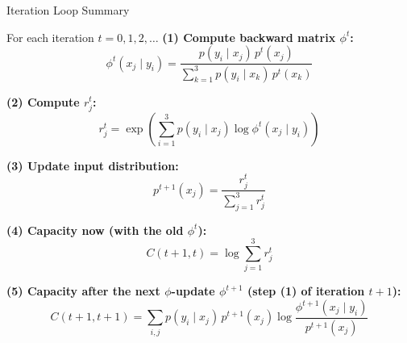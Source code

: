 \documentclass{beamer}
\begin{document}
\begin{frame}[t]{Iteration Loop Summary}
    \footnotesize
    \begin{exampleblock}{For each iteration $t = 0, 1, 2, \ldots$}
        \textbf{(1) Compute backward matrix $\phi^t$:}\vspace{-0.3em}
        $$
            \phi^t(x_j \mid y_i) = \frac{p(y_i \mid x_j)\, p^t(x_j)}{\sum_{k=1}^{3} p(y_i \mid x_k)\, p^t(x_k)}
        $$
        \vspace{-1.4em}

        \textbf{(2) Compute $r_j^t$:}\vspace{-0.3em}
        $$
            r_j^t = \exp\!\left( \sum_{i=1}^{3} p(y_i \mid x_j) \log \phi^t(x_j \mid y_i) \right)
        $$
        \vspace{-1.4em}

        \textbf{(3) Update input distribution:}\vspace{-0.3em}
        $$
            p^{t+1}(x_j) = \frac{r_j^t}{\sum_{j=1}^{3} r_j^t}
        $$
        \vspace{-1.4em}

        \textbf{(4) Capacity now (with the old $\phi^t$):}\vspace{-0.3em}
        $$
            C(t+1, t) = \log \sum_{j=1}^{3} r_j^t
        $$
        \vspace{-1.4em}

        \textbf{(5) Capacity after the next $\phi$-update $\phi^{t+1}$ (step (1) of iteration $t{+}1$):}\vspace{-0.3em}
        $$
            C(t+1, t+1) = \sum_{i,j} p(y_i \mid x_j)\, p^{t+1}(x_j) \log \frac{\phi^{t+1}(x_j \mid y_i)}{p^{t+1}(x_j)}
        $$
    \end{exampleblock}
\end{frame}
\end{document}
